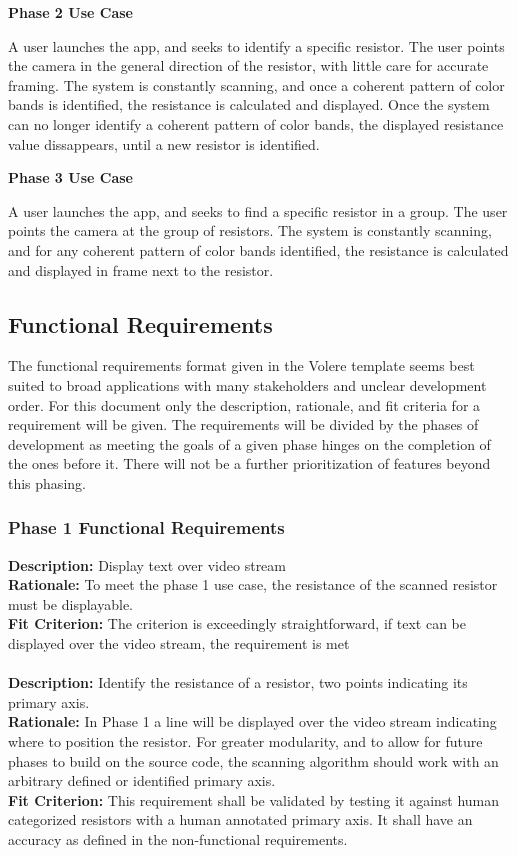 \documentclass{article}
\begin{document}
\textbf{ Phase 2 Use Case}

A user launches the app, and seeks to identify a specific resistor.
The user points the camera in the general direction of the resistor, with little care for accurate framing.
The system is constantly scanning, and once a coherent pattern of color bands is identified, the resistance is calculated and displayed.
Once the system can no longer identify a coherent pattern of color bands, the displayed resistance value dissappears, until a new resistor is identified.

\textbf{ Phase 3 Use Case}

A user launches the app, and seeks to find a specific resistor in a group.
The user points the camera at the group of resistors.
The system is constantly scanning, and for any coherent pattern of color bands identified, the resistance is calculated and displayed in frame next to the resistor.

\subsection{Functional Requirements}

The functional requirements format given in the Volere template seems best suited to broad applications with many stakeholders and unclear development order.
For this document only the description, rationale, and fit criteria for a requirement will be given.
The requirements will be divided by the phases of development as meeting the goals of a given phase hinges on the completion of the ones before it.
There will not be a further prioritization of features beyond this phasing.

\subsubsection{ Phase 1 Functional Requirements}

\textbf{Description:} Display text over video stream
\\ \textbf{Rationale:} To meet the phase 1 use case, the resistance of the scanned resistor must be displayable.
\\ \textbf{Fit Criterion:} The criterion is exceedingly straightforward, if text can be displayed over the video stream, the requirement is met
\\ \\
\textbf{Description: } Identify the resistance of a resistor, two points indicating its primary axis.
\\ \textbf{Rationale: } In Phase 1 a line will be displayed over the video stream indicating where to position the resistor.
For greater modularity, and to allow for future phases to build on the source code, the scanning algorithm should work with an arbitrary defined or identified primary axis.
\\ \textbf{Fit Criterion:} This requirement shall be validated by testing it against human categorized resistors with a human annotated primary axis.
It shall have an accuracy as defined in the non-functional requirements.
\end{document}
